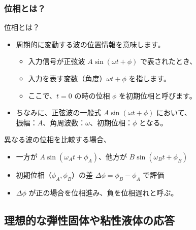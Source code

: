 \documentclass[unicode,12pt]{beamer}%
\begin{document}
\begin{frame}
	\frametitle{位相とは？}
		\begin{block}{位相とは？}
			\begin{itemize}
				\item 周期的に変動する波の位置情報を意味します。
				\begin{itemize}
					\item 入力信号が正弦波 $A \sin (\omega t + \phi)$ で表されたとき、
					\item 入力を表す変数（角度）$\omega t + \phi$ を指します。
					\item ここで、$t=0$ の時の位相 $\phi$ を初期位相と呼びます。
				\end{itemize}
				\item ちなみに、正弦波の一般式 $A \sin (\omega t + \phi)$ において、\\
				振幅：$A$、角周波数：$\omega$、初期位相：$\phi$ となる。
			\end{itemize}
		\end{block}

		\begin{alertblock}{異なる波の位相を比較する場合、}
			\begin{itemize}
				\item 一方が $A \sin (\omega_A t + \phi_A)$、他方が $B \sin (\omega_B t + \phi_B)$  
				\item 初期位相（$\phi_A, \phi_B$）の差 $\Delta \phi = \phi_B - \phi_A$ で評価
				\item $\Delta \phi$ が正の場合を位相進み、負を位相遅れと呼ぶ。
			\end{itemize}
		\end{alertblock}
\end{frame}

\subsection{理想的な弾性固体や粘性液体の応答}
\end{document}
